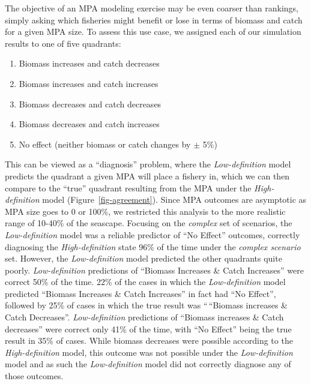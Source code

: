 \documentclass[
  default,
  lineno,
  referee]{sn-jnl}
\providecommand{\tightlist}{%
  \setlength{\itemsep}{0pt}\setlength{\parskip}{0pt}}\usepackage{longtable,booktabs,array}
\begin{document}
The objective of an MPA modeling exercise may be even coarser than
rankings, simply asking which fisheries might benefit or lose in terms
of biomass and catch for a given MPA size. To assess this use case, we
assigned each of our simulation results to one of five quadrants:

\begin{enumerate}
\def\labelenumi{\arabic{enumi}.}
\tightlist
\item
  Biomass increases and catch decreases
\item
  Biomass increases and catch increases
\item
  Biomass decreases and catch decreases
\item
  Biomass decreases and catch increases
\item
  No effect (neither biomass or catch changes by \(\pm\) 5\%)
\end{enumerate}

This can be viewed as a ``diagnosis'' problem, where the
\emph{Low-definition} model predicts the quadrant a given MPA will place
a fishery in, which we can then compare to the ``true'' quadrant
resulting from the MPA under the \emph{High-definition} model
(Figure~\ref{fig-agreement}). Since MPA outcomes are asymptotic as MPA
size goes to 0 or 100\%, we restricted this analysis to the more
realistic range of 10-40\% of the seascape. Focusing on the
\emph{complex} set of scenarios, the \emph{Low-definition} model was a
reliable predictor of ``No Effect'' outcomes, correctly diagnosing the
\emph{High-definition} state 96\% of the time under the \emph{complex
scenario} set. However, the \emph{Low-definition} model predicted the
other quadrants quite poorly. \emph{Low-definition} predictions of
``Biomass Increases \& Catch Increases'' were correct 50\% of the time.
22\% of the cases in which the \emph{Low-definition} model predicted
``Biomass Increases \& Catch Increases'' in fact had ``No Effect'',
followed by 25\% of cases in which the true result was ``\,``Biomass
increases \& Catch Decreases''. \emph{Low-definition} predictions of
``Biomass increases \& Catch decreases'' were correct only 41\% of the
time, with ``No Effect'' being the true result in 35\% of cases. While
biomass decreases were possible according to the \emph{High-definition}
model, this outcome was not possible under the \emph{Low-definition}
model and as such the \emph{Low-definition} model did not correctly
diagnose any of those outcomes.
\end{document}
